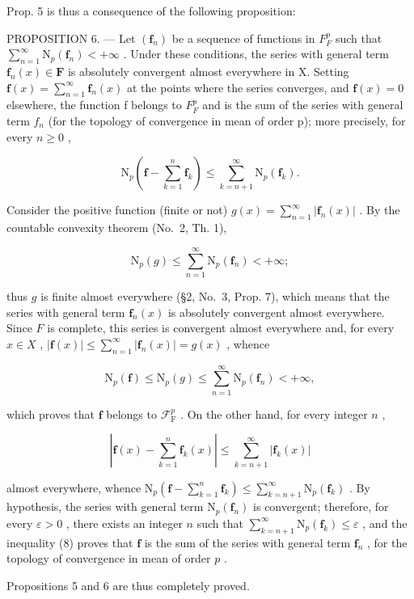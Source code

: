 Prop. 5 is thus a consequence of the following proposition:

PROPOSITION 6. --- Let \((\mathbf{f}_{n})\) be a sequence of functions in \(F_{F}^{p}\) such that \(\sum_{n=1}^{\infty}\mathrm{N}_{p}(\mathbf{f}_{n})<+\infty\) . Under these conditions, the series with general term \(\mathbf{f}_{n}(x)\in\mathbf{F}\) is absolutely convergent almost everywhere in X. Setting \(\mathbf{f}(x)=\sum_{n=1}^{\infty}\mathbf{f}_{n}(x)\) at the points where the series converges, and \(\mathbf{f}(x)=0\) elsewhere, the function f belongs to \(F_{F}^{p}\) and is the sum of the series with general term \(f_{n}\) (for the topology of convergence in mean of order p); more precisely, for every \(n\geqslant0\) ,

\[
\mathrm{N} _ {p} \left(\mathbf {f} - \sum_ {k = 1} ^ {n} \mathbf {f} _ {k}\right) \leqslant \sum_ {k = n + 1} ^ {\infty} \mathrm{N} _ {p} (\mathbf {f} _ {k}).\tag{8}
\]

Consider the positive function (finite or not) \(g(x) = \sum_{n=1}^{\infty} |\mathbf{f}_n(x)|\) . By the countable convexity theorem (No.~2, Th. 1),

\[
\mathrm{N} _ {p} (g) \leqslant \sum_ {n = 1} ^ {\infty} \mathrm{N} _ {p} (\mathbf {f} _ {n}) <   + \infty ;
\]

thus \(g\) is finite almost everywhere (§2, No.~3, Prop. 7), which means that the series with general term \(\mathbf{f}_n(x)\) is absolutely convergent almost everywhere. Since \(F\) is complete, this series is convergent almost everywhere and, for every \(x \in X\) , \(|\mathbf{f}(x)| \leqslant \sum_{n=1}^{\infty} |\mathbf{f}_n(x)| = g(x)\) , whence

\[
\mathrm{N} _ {p} (\mathbf {f}) \leqslant \mathrm{N} _ {p} (g) \leqslant \sum_ {n = 1} ^ {\infty} \mathrm{N} _ {p} (\mathbf {f} _ {n}) <   + \infty ,
\]

which proves that \(\mathbf{f}\) belongs to \(\mathcal{F}_{\mathrm{F}}^{p}\) . On the other hand, for every integer \(n\) ,

\[
\left| \mathbf {f} (x) - \sum_ {k = 1} ^ {n} \mathbf {f} _ {k} (x) \right| \leqslant \sum_ {k = n + 1} ^ {\infty} | \mathbf {f} _ {k} (x) |
\]

almost everywhere, whence \(\mathrm{N}_{p}\left(\mathbf{f}-\sum_{k=1}^{n}\mathbf{f}_{k}\right)\leqslant\sum_{k=n+1}^{\infty}\mathrm{N}_{p}(\mathbf{f}_{k})\) . By hypothesis, the series with general term \(\mathrm{N}_{p}(\mathbf{f}_{n})\) is convergent; therefore, for every \(\varepsilon > 0\) , there exists an integer \(n\) such that \(\sum_{k=n+1}^{\infty} \mathrm{N}_{p}(\mathbf{f}_{k}) \leqslant \varepsilon\) , and the inequality (8) proves that \(\mathbf{f}\) is the sum of the series with general term \(\mathbf{f}_{n}\) , for the topology of convergence in mean of order \(p\) .

Propositions 5 and 6 are thus completely proved.


